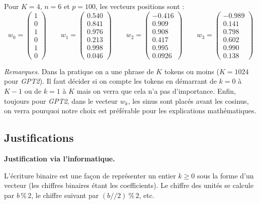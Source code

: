 \documentclass[11pt,class=report,crop=false]{standalone}
\begin{document}
\begin{exemple}
Pour $K=4$, $n=6$ et $p=100$, les vecteurs positions sont :
$$w_0 = 
\begin{pmatrix}
1 \\ 0 \\ 1 \\ 0 \\ 1 \\ 0	
\end{pmatrix}
\qquad
w_1 = 
\begin{pmatrix}
0.540 \\ 0.841 \\ 0.976 \\ 0.213 \\ 0.998 \\ 0.046
\end{pmatrix}
\qquad
w_2 = 
\begin{pmatrix}
-0.416 \\  0.909 \\ 0.908 \\  0.417 \\  0.995 \\  0.0926
\end{pmatrix}
\qquad
w_3 = 
\begin{pmatrix}
-0.989 \\   0.141 \\  0.798 \\  0.602 \\ 0.990 \\ 0.138	
\end{pmatrix}
$$
\end{exemple}


\emph{Remarques.} Dans la pratique on a une phrase de $K$ tokens ou moins ($K=1024$ pour \emph{GPT2}). Il faut décider si on compte les tokens en démarrant de $k=0$ à $K-1$ ou de $k=1$ à $K$ mais on verra que cela n'a pas d'importance. 
Enfin, toujours pour \emph{GPT2}, dans le vecteur $w_k$, les sinus sont placés avant les cosinus, on verra pourquoi notre choix est préférable pour les explications mathématiques.


\subsection{Justifications}

\textbf{Justification via l'informatique.}

L'écriture binaire  est une façon de représenter un entier $k\ge0$ sous la forme d'un vecteur (les chiffres binaires étant les coefficients).
Le chiffre des unités se calcule par $b \, \% \,2$, le chiffre suivant par $(b/\!/2) \ \% \, 2$, etc.
\end{document}
